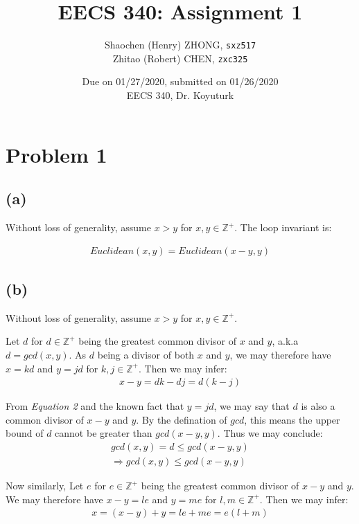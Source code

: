 \documentclass[12pt]{article}
\newcommand{\inlinecode}{\texttt}
\begin{document}
\title{\textbf{EECS 340: Assignment 1}}

\author{Shaochen (Henry) ZHONG, \inlinecode{sxz517} \\ Zhitao (Robert) CHEN, \inlinecode{zxc325}}
\date{Due on 01/27/2020, submitted on 01/26/2020 \\ EECS 340, Dr. Koyuturk}
\maketitle

\section{Problem 1}
\subsection{(a)}
Without loss of generality, assume $x > y$ for $x, y \in \mathbb{Z^+}$. The loop invariant is:

\begin{gather}
    Euclidean(x, y) = Euclidean(x - y, y)
\end{gather}

\subsection{(b)}
Without loss of generality, assume $x > y$ for $x, y \in \mathbb{Z^+}$.

Let $d$ for $d \in \mathbb{Z^+}$ being the greatest common divisor of $x$ and $y$, a.k.a $d = gcd(x, y)$. As $d$ being a divisor of both $x$ and $y$, we may therefore have $x = kd$ and $y = jd$ for $k, j \in \mathbb{Z^+}$. Then we may infer:
\begin{gather}
    x - y = dk - dj = d(k - j)
\end{gather}

From \textit{Equation 2} and the known fact that $y = jd$, we may say that $d$ is also a common divisor of $x - y$ and $y$. By the defination of $gcd$, this means the upper bound of $d$ cannot be greater than $gcd(x-y, y)$. Thus we may conclude:
\begin{gather}
    gcd(x, y) = d \leq gcd(x-y, y) \nonumber \\
    \Rightarrow gcd(x, y) \leq gcd(x-y, y)
\end{gather}

Now similarly, Let $e$ for $e \in \mathbb{Z^+}$ being the greatest common divisor of $x-y$ and $y$. We may therefore have $x - y = le$ and $y = me$ for $l, m \in \mathbb{Z^+}$. Then we may infer:
\begin{gather}
    x = (x - y) + y = le + me = e(l + m)
\end{gather}
\end{document}
